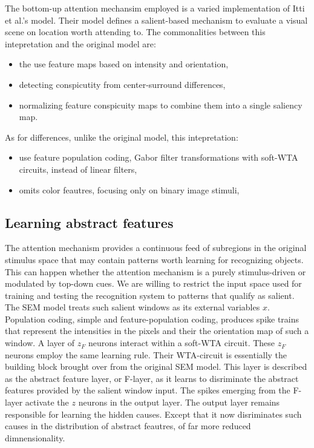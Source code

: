 \documentclass{report}
\begin{document}
The bottom-up attention mechansim employed is a varied implementation of Itti et al.'s model. Their model defines a salient-based mechanism to evaluate a visual scene on location worth attending to.
The commonalities between this intepretation and the original model are:
\begin{itemize}
  \item the use feature maps based on intensity and orientation,
  \item detecting conspicutity from center-surround differences,
  \item normalizing feature conspicuity maps to combine them into a single saliency map.
\end{itemize}
As for differences, unlike the original model, this intepretation:
\begin{itemize}
  \item use feature population coding, Gabor filter transformations with soft-WTA circuits, instead of linear filters,
  \item omits color feautres, focusing only on binary image stimuli,
\end{itemize}

\subsection{Learning abstract features}

The attention mechanism provides a continuous feed of subregions in the original stimulus space that may contain patterns worth learning for recognizing objects. This can happen whether the attention mechanism is a purely stimulus-driven or modulated by top-down cues. We are willing to restrict the input space used for training and testing the recognition system to patterns that qualify as salient. The SEM model treats such salient windows as its external variables $x$. Population coding, simple and feature-population coding, produces spike trains that represent the intensities in the pixels and their the orientation map of such a window. A layer of $z_F$ neurons interact within a soft-WTA circuit. These $z_F$ neurons employ the same learning rule. Their WTA-circuit is essentially the building block brought over from the original SEM model. This layer is described as the abstract feature layer, or F-layer, as it learns to disriminate the abstract features provided by the salient window input. The spikes emerging from the F-layer activate the $z$ neurons in the output layer. The output layer remains responsible for learning the hidden causes. Except that it now disriminates such causes in the distribution of abstract feautres, of far more reduced dimnensionality.
\end{document}
